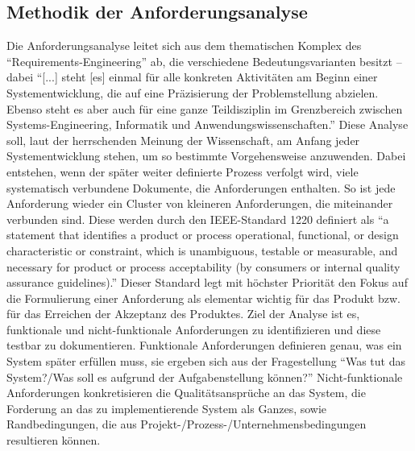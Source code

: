 \subsection{Methodik der Anforderungsanalyse}\label{kap:methodikAnfAnalyse}
Die Anforderungsanalyse leitet sich aus dem thematischen Komplex des \enquote{Requirements-Engineering} ab, die verschiedene Bedeutungsvarianten besitzt -- dabei \enquote{[...] steht [es] einmal für alle konkreten Aktivitäten am Beginn einer Systementwicklung, die auf eine Präzisierung der Problemstellung abzielen. Ebenso steht es aber auch für eine ganze Teildisziplin im Grenzbereich zwischen Systems-Engineering, Informatik und Anwendungswissenschaften.}\autocite[][S.\,19]{partsch_requirements-engineering_2010} Diese Analyse soll, laut der herrschenden Meinung der Wissenschaft, am Anfang jeder Systementwicklung stehen, um so bestimmte Vorgehensweise anzuwenden. Dabei entstehen, wenn der später weiter definierte Prozess verfolgt wird, viele systematisch verbundene Dokumente, die Anforderungen enthalten. So ist jede Anforderung wieder ein Cluster von kleineren Anforderungen, die miteinander verbunden sind. Diese werden durch den IEEE-Standard 1220 definiert als \enquote{a statement that identifies a product or process operational, functional, or design characteristic or constraint, which is unambiguous, testable or measurable, and necessary for product or process acceptability (by consumers or internal quality assurance guidelines).}\autocite[][S.\,9]{IEEE1220-2005SystemsEng} Dieser Standard legt mit höchster Priorität den Fokus auf die Formulierung einer Anforderung als elementar wichtig für das Produkt bzw. für das Erreichen der Akzeptanz des Produktes. Ziel der Analyse ist es, funktionale und nicht-funktionale Anforderungen zu identifizieren und diese testbar zu dokumentieren. Funktionale Anforderungen definieren genau, was ein System später erfüllen muss, sie ergeben sich aus der Fragestellung \enquote{Was tut das System?/Was soll es aufgrund der Aufgabenstellung können?}\autocite[][S.\,27]{partsch_requirements-engineering_2010} Nicht-funktionale Anforderungen konkretisieren die Qualitätsansprüche an das System, die Forderung an das zu implementierende System als Ganzes, sowie Randbedingungen, die aus Projekt-/Prozess-/Unternehmensbedingungen resultieren können.\autocite[vgl.][S.\,27-29]{partsch_requirements-engineering_2010}

